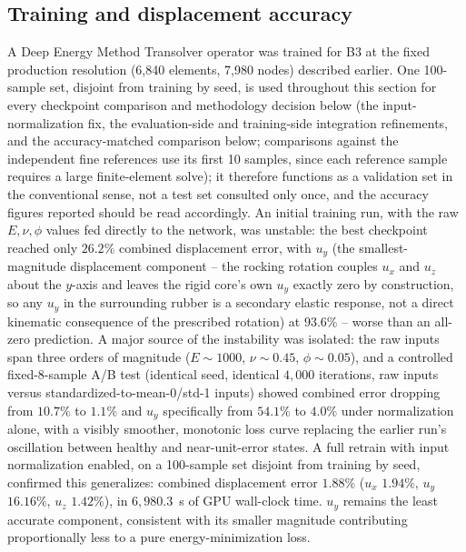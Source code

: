 \documentclass[final,5p,times]{elsarticle}
\begin{document}
\subsection{Training and displacement accuracy}
A Deep Energy Method Transolver operator was trained for B3 at the fixed
production resolution (6,840 elements, 7,980 nodes) described earlier.
One 100-sample set, disjoint from training by seed, is used throughout
this section for every checkpoint comparison and methodology decision
below (the input-normalization fix, the evaluation-side and
training-side integration refinements, and the accuracy-matched
comparison below; comparisons against the independent fine references
use its first 10 samples, since each reference sample requires a large
finite-element solve); it therefore functions as a validation set in the
conventional sense, not a
test set consulted only once, and the accuracy figures reported should be
read accordingly. An initial training run, with the raw
$E,\nu,\phi$ values fed directly to the network, was unstable: the best
checkpoint reached only $26.2\%$ combined displacement error, with
$u_y$ (the smallest-magnitude displacement component -- the rocking
rotation couples $u_x$ and $u_z$ about the $y$-axis and leaves the rigid
core's own $u_y$ exactly zero by construction, so any $u_y$ in the
surrounding rubber is a secondary elastic response, not a direct
kinematic consequence of the prescribed rotation) at $93.6\%$ -- worse
than an all-zero prediction. A major source of the instability was
isolated: the raw inputs span three orders of
magnitude ($E\!\sim\!1000$, $\nu\!\sim\!0.45$, $\phi\!\sim\!0.05$), and a
controlled fixed-8-sample A/B test (identical seed, identical $4{,}000$
iterations, raw inputs versus standardized-to-mean-0/std-1 inputs) showed
combined error dropping from $10.7\%$ to $1.1\%$ and $u_y$ specifically
from $54.1\%$ to $4.0\%$ under normalization alone, with a visibly
smoother, monotonic loss curve replacing the earlier run's oscillation
between healthy and near-unit-error states. A full retrain with input
normalization enabled, on a 100-sample set disjoint from training by
seed, confirmed this generalizes: combined displacement error $1.88\%$ ($u_x$ $1.94\%$,
$u_y$ $16.16\%$, $u_z$ $1.42\%$), in $6{,}980.3$~s of GPU wall-clock time.
$u_y$ remains the least accurate component, consistent with its smaller
magnitude contributing proportionally less to a pure energy-minimization
loss.
\end{document}
